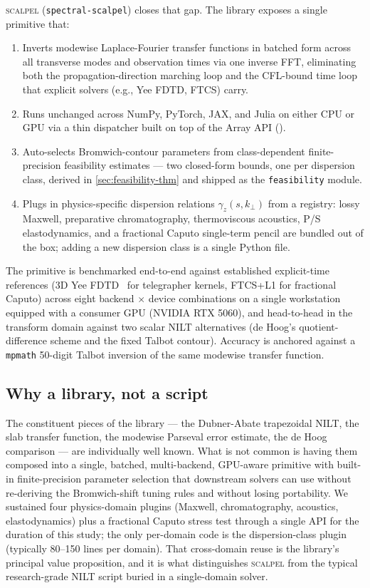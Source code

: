 \documentclass[manuscript,review]{acmart}
\newcommand{\kperp}{k_\perp}
\newcommand{\gammaz}{\gamma_z}
\newcommand{\scalpel}{\textsc{scalpel}}
\begin{document}
\scalpel{} (\texttt{spectral-scalpel}) closes that gap. The library
exposes a single primitive that:
\begin{enumerate}[label=(\arabic*),leftmargin=*]
\item Inverts modewise Laplace-Fourier transfer functions in batched
form across all transverse modes and observation times via one
inverse FFT, eliminating both the propagation-direction marching
loop and the CFL-bound time loop that explicit solvers (e.g., Yee
FDTD, FTCS) carry.
\item Runs unchanged across NumPy, PyTorch, JAX, and Julia on either
CPU or GPU via a thin dispatcher built on top of the Array API
(\cite{arrayapi2022}).
\item Auto-selects Bromwich-contour parameters from
class-dependent finite-precision feasibility estimates --- two
closed-form bounds, one per dispersion class, derived in
\cref{sec:feasibility-thm} and shipped as the
\texttt{feasibility} module.
\item Plugs in physics-specific dispersion relations $\gammaz(s,
\kperp)$ from a registry: lossy Maxwell, preparative chromatography,
thermoviscous acoustics, P/S elastodynamics, and a fractional
Caputo single-term pencil are bundled out of the box; adding a new
dispersion class is a single Python file.
\end{enumerate}

The primitive is benchmarked end-to-end against established
explicit-time references (3D Yee FDTD~\cite{yee1966,taflove2005} for
telegrapher kernels, FTCS+L1 for fractional Caputo) across eight
backend $\times$ device
combinations on a single workstation equipped with a consumer GPU
(NVIDIA RTX 5060), and head-to-head in the transform domain against
two scalar NILT alternatives (de Hoog's quotient-difference scheme
and the fixed Talbot contour). Accuracy is anchored against a
\texttt{mpmath} 50-digit Talbot inversion of the same modewise
transfer function.

\subsection{Why a library, not a script}

The constituent pieces of the library --- the Dubner-Abate
trapezoidal NILT, the slab transfer function, the modewise
Parseval error estimate, the de Hoog comparison --- are individually
well known. What is not common is having them composed into a
single, batched, multi-backend, GPU-aware primitive with built-in
finite-precision parameter selection that downstream solvers can use
without re-deriving the Bromwich-shift tuning rules and without
losing portability. We sustained four physics-domain plugins
(Maxwell, chromatography, acoustics, elastodynamics) plus a
fractional Caputo stress test through a single API for the duration
of this study; the only per-domain code is the dispersion-class
plugin (typically 80--150 lines per domain). That cross-domain reuse
is the library's principal value proposition, and it is what
distinguishes \scalpel{} from the typical research-grade NILT script
buried in a single-domain solver.
\end{document}
